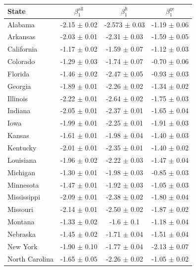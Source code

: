 \begin{table}[H]
    \centering
    \begin{tabular}{lccc}
        \hline
        State & $\beta_1^{\text{all}}$ & $\beta_1^{\text{lt}}$ & $\beta_1^{\text{ge}}$ \\
        \hline
        Alabama & -2.15 $\pm$ 0.02 & -2.573 $\pm$ 0.03 & -1.19 $\pm$ 0.06 \\
        Arkansas & -2.03 $\pm$ 0.01 & -2.31 $\pm$ 0.03 & -1.59 $\pm$ 0.05 \\
        California & -1.17 $\pm$ 0.02 & -1.59 $\pm$ 0.07 & -1.12 $\pm$ 0.03 \\
        Colorado & -1.29 $\pm$ 0.03 & -1.74 $\pm$ 0.07 & -0.70 $\pm$ 0.06 \\
        Florida & -1.46 $\pm$ 0.02 & -2.47 $\pm$ 0.05 & -0.93 $\pm$ 0.03 \\
        Georgia & -1.89 $\pm$ 0.01 & -2.26 $\pm$ 0.02 & -1.34 $\pm$ 0.02 \\
        Illinois & -2.22 $\pm$ 0.01 & -2.64 $\pm$ 0.02 & -1.75 $\pm$ 0.03 \\
        Indiana & -2.05 $\pm$ 0.01 & -2.37 $\pm$ 0.01 & -1.65 $\pm$ 0.04 \\
        Iowa & -1.99 $\pm$ 0.01 & -2.25 $\pm$ 0.01 & -1.91 $\pm$ 0.03 \\
        Kansas & -1.61 $\pm$ 0.01 & -1.98 $\pm$ 0.04 & -1.40 $\pm$ 0.03 \\
        Kentucky & -2.01 $\pm$ 0.01 & -2.35 $\pm$ 0.01 & -1.40 $\pm$ 0.02 \\
        Louisiana & -1.96 $\pm$ 0.02 & -2.22 $\pm$ 0.03 & -1.47 $\pm$ 0.04 \\
        Michigan & -1.30 $\pm$ 0.01 & -1.98 $\pm$ 0.03 & -0.85 $\pm$ 0.03 \\
        Minnesota & -1.47 $\pm$ 0.01 & -1.92 $\pm$ 0.03 & -1.05 $\pm$ 0.03 \\
        Mississippi & -2.09 $\pm$ 0.01 & -2.38 $\pm$ 0.02 & -1.80 $\pm$ 0.04 \\
        Missouri & -2.14 $\pm$ 0.01 & -2.50 $\pm$ 0.02 & -1.87 $\pm$ 0.02 \\
        Montana & -1.33 $\pm$ 0.02 & -1.6 $\pm$ 0.1 & -1.18 $\pm$ 0.04 \\
        Nebraska & -1.45 $\pm$ 0.02 & -1.71 $\pm$ 0.04 & -1.51 $\pm$ 0.04 \\
        New York & -1.90 $\pm$ 0.10 & -1.77 $\pm$ 0.04 & -2.13 $\pm$ 0.07 \\
        North Carolina & -1.65 $\pm$ 0.05 & -2.26 $\pm$ 0.02 & -1.05 $\pm$ 0.02 \\

\end{tabular}
\end{table}
